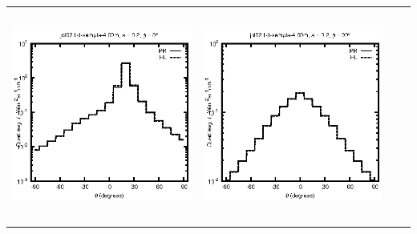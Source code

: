 \begin{tabular}{c c c c}
\includegraphics[height=7cm]{../eps/jol02_Ld_sample_4.00m_fwd.eps} &
\includegraphics[height=7cm]{../eps/jol02_Ld_sample_4.00m_cross.eps} \\
\end{tabular}

\pagebreak

